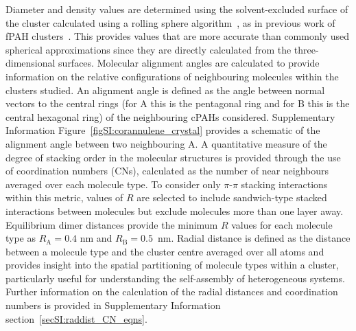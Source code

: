 Diameter and density values are determined using the solvent-excluded surface of the cluster calculated using a rolling sphere algorithm~\cite{sanner1996reduced}, as in previous work of fPAH clusters~\cite{chen2020reactive,bowal2020surface}. This provides values that are more accurate than commonly used spherical approximations since they are directly calculated from the three-dimensional surfaces.
Molecular alignment angles are calculated to provide information on the relative configurations of neighbouring molecules within the clusters studied. An alignment angle is defined as the angle between normal vectors to the central rings (for A this is the pentagonal ring and for B this is the central hexagonal ring) of the neighbouring cPAHs considered.  Supplementary Information Figure~\ref{figSI:corannulene_crystal} provides a schematic of the alignment angle between two neighbouring A.
A quantitative measure of the degree of stacking order in the molecular structures is provided through the use of coordination numbers (CNs), calculated as the number of near neighbours averaged over each molecule type. To consider only $\pi$-$\pi$ stacking interactions within this metric, values of $R$ are selected to include sandwich-type stacked interactions between molecules but exclude molecules more than one layer away. Equilibrium dimer distances provide the minimum $R$ values for each molecule type as $R_{\text{A}} = 0.4$ nm and $R_{\text{B}} = 0.5$~nm.
Radial distance is defined as the distance between a molecule type and the cluster centre averaged over all atoms and provides insight into the spatial partitioning of molecule types within a cluster, particularly useful for understanding the self-assembly of heterogeneous systems. Further information on the calculation of the radial distances and coordination numbers is provided in Supplementary Information section~\ref{secSI:raddist_CN_eqns}.


